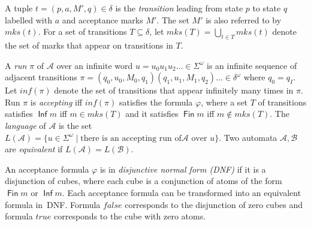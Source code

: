 \documentclass[a4paper,UKenglish,cleveref,autoref,thm-restate]{lipics-v2021}
\DeclareMathOperator{\Inf}{\mathsf{Inf}}
\DeclareMathOperator{\Fin}{\mathsf{Fin}}
\newcommand{\minf}{\mathit{inf}}
\newcommand{\mks}{\mathit{mks}}
\def\false{\mathit{false}}
\def\true{\mathit{true}}
\newcommand{\mA}{\mathcal{A}}
\newcommand{\mB}{\mathcal{B}}
\begin{document}
A tuple $t=(p,a,M',q)\in\delta$ is the \emph{transition} leading from
state $p$ to state $q$ labelled with $a$ and acceptance marks $M'$.
The set $M'$ is also referred to by $\mks(t)$. For a set of transitions
$T\subseteq\delta$, let $\mks(T)=\bigcup_{t\in T}\mks(t)$ denote the
set of marks that appear on transitions in $T$.

A \emph{run} $\pi$ of $\mA$ over an infinite word
$u = u_{0}u_{1}u_{2}\ldots \in \Sigma^{\omega}$ is an infinite sequence
of adjacent transitions
$\pi=(q_0,u_0,M_0,q_1)(q_1,u_1,M_1,q_2)\ldots\in\delta^{\omega}$ where
$q_0=q_I$. Let $\minf(\pi)$ denote the set of transitions that appear
infinitely many times in $\pi$. Run $\pi$ is \emph{accepting} iff
$\minf(\pi)$ satisfies the formula $\varphi$, where a set $T$ of
transitions satisfies $\Inf m$ iff $m\in\mks(T)$ and it satisfies
$\Fin m$ iff $m\not\in\mks(T)$. The \emph{language} of $\mA$ is
the set
$L(\mA)=\{u\in \Sigma^{\omega}\mid\textrm{there is an accepting run of
}\mA\textrm{ over }u\}$. Two automata $\mA,\mB$ are \emph{equivalent}
if $L(\mA)=L(\mB)$.

An acceptance formula $\varphi$ is in \emph{disjunctive normal form
  (DNF)} if it is a disjunction of cubes, where each cube is a
conjunction of atoms of the form $\Fin m$ or $\Inf m$.  Each
acceptance formula can be transformed into an equivalent formula
in~DNF. Formula $\false$ corresponds to the disjunction of zero
cubes and formula $\true$ corresponds to the cube with zero atoms.
\end{document}
